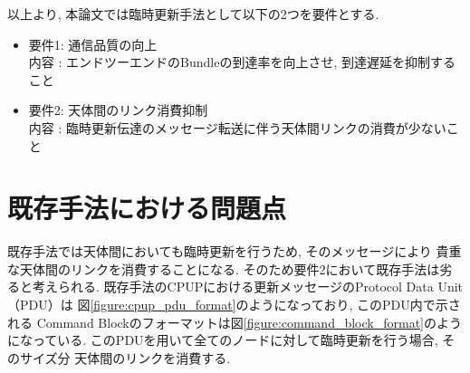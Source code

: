 以上より, 本論文では臨時更新手法として以下の2つを要件とする. 

\begin{center}
    \raggedright
    \begin{itemize}
        \item 要件1: 通信品質の向上 \\
                内容 : エンドツーエンドのBundleの到達率を向上させ, 到達遅延を抑制すること \\
        \item 要件2: 天体間のリンク消費抑制 \\
                内容 : 臨時更新伝達のメッセージ転送に伴う天体間リンクの消費が少ないこと
        　　　　
    \end{itemize}
\end{center}

\section{既存手法における問題点}
\label{section:既存手法における問題点}
既存手法では天体間においても臨時更新を行うため, そのメッセージにより
貴重な天体間のリンクを消費することになる.
そのため要件2において既存手法は劣ると考えられる.
既存手法のCPUPにおける更新メッセージのProtocol Data Unit（PDU）は
図\ref{figure:cpup_pdu_format}のようになっており, このPDU内で示される
Command Blockのフォーマットは図\ref{figure:command_block_format}のようになっている.
このPDUを用いて全てのノードに対して臨時更新を行う場合, そのサイズ分
天体間のリンクを消費する.

